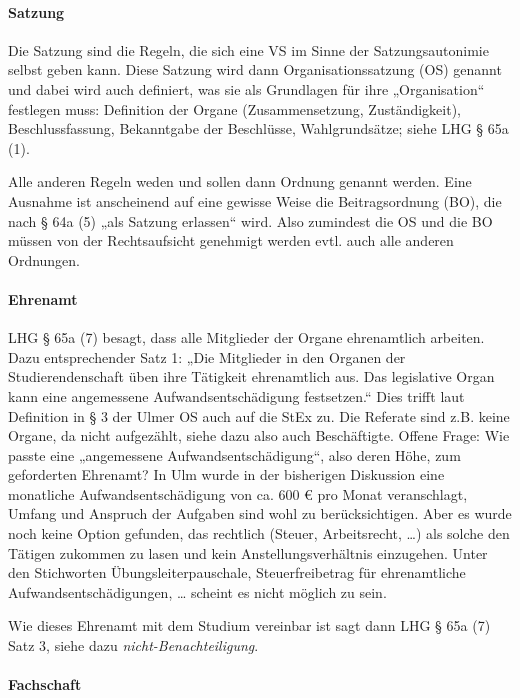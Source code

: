 \documentclass[
10pt,
a4paper,
twoside,								%
titlepage=false,							%
draft=false								%
]{scrartcl}
\begin{document}
\paragraph{Satzung}

Die Satzung sind die Regeln, die sich eine VS im Sinne der Satzungsautonimie selbst geben kann. Diese Satzung wird dann Organisationssatzung (OS) genannt und dabei wird auch definiert, was sie als Grundlagen für ihre „Organisation“ festlegen muss: Definition der Organe (Zusammensetzung, Zuständigkeit), Beschlussfassung, Bekanntgabe der Beschlüsse, Wahlgrundsätze; siehe LHG § 65a (1).

Alle anderen Regeln weden und sollen dann Ordnung genannt werden. Eine Ausnahme ist anscheinend auf eine gewisse Weise die Beitragsordnung (BO), die nach § 64a (5) „als Satzung erlassen“ wird. Also zumindest die OS und die BO müssen von der Rechtsaufsicht genehmigt werden evtl. auch alle anderen Ordnungen.


\paragraph{Ehrenamt}

LHG § 65a (7) besagt, dass alle Mitglieder der Organe ehrenamtlich arbeiten. Dazu entsprechender Satz 1: „Die Mitglieder in den Organen der Studierendenschaft üben ihre Tätigkeit ehrenamtlich aus. Das legislative Organ kann eine angemessene Aufwandsentschädigung festsetzen.“ Dies trifft laut Definition in § 3 der Ulmer OS auch auf die StEx zu. Die Referate sind z.B. keine Organe, da nicht aufgezählt, siehe dazu also auch Beschäftigte.
Offene Frage: Wie passte eine „angemessene Aufwandsentschädigung“, also deren Höhe, zum geforderten Ehrenamt? In Ulm wurde in der bisherigen Diskussion eine monatliche Aufwandsentschädigung von ca. 600 € pro Monat veranschlagt, Umfang und Anspruch der Aufgaben sind wohl zu berücksichtigen. Aber es wurde noch keine Option gefunden, das rechtlich (Steuer, Arbeitsrecht, …) als solche den Tätigen zukommen zu lasen und kein Anstellungsverhältnis einzugehen. Unter den Stichworten Übungsleiterpauschale, Steuerfreibetrag für ehrenamtliche Aufwandsentschädigungen, … scheint es nicht möglich zu sein.

Wie dieses Ehrenamt mit dem Studium vereinbar ist sagt dann LHG § 65a (7) Satz 3, siehe dazu \emph{nicht-Benachteiligung}.


\paragraph{Fachschaft}
\end{document}
